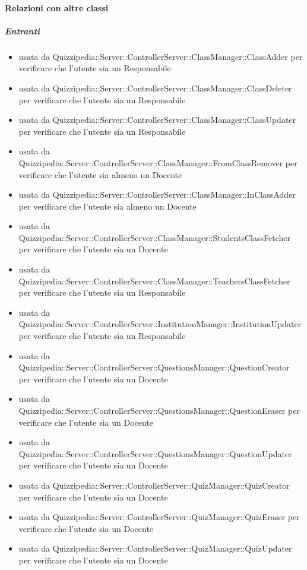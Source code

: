 \paragraph{Relazioni con altre classi}
\subparagraph{Entranti}
\begin{itemize}
\item usata da Quizzipedia::Server::ControllerServer::ClassManager::ClassAdder per verificare che l'utente sia un Responsabile
\item usata da Quizzipedia::Server::ControllerServer::ClassManager::ClassDeleter per verificare che l'utente sia un Responsabile
\item usata da Quizzipedia::Server::ControllerServer::ClassManager::ClassUpdater per verificare che l'utente sia un Responsabile
\item usata da Quizzipedia::Server::ControllerServer::ClassManager::FromClassRemover per verificare che l'utente sia almeno un Docente
\item usata da Quizzipedia::Server::ControllerServer::ClassManager::InClassAdder per verificare che l'utente sia almeno un Docente
\item usata da Quizzipedia::Server::ControllerServer::ClassManager::StudentsClassFetcher per verificare che l'utente sia un Docente
\item usata da Quizzipedia::Server::ControllerServer::ClassManager::TeachersClassFetcher per verificare che l'utente sia un Responsabile
\item usata da Quizzipedia::Server::ControllerServer::InstitutionManager::InstitutionUpdater per verificare che l'utente sia un Responsabile
\item usata da Quizzipedia::Server::ControllerServer::QuestionsManager::QuestionCreator per verificare che l'utente sia un Docente
\item usata da Quizzipedia::Server::ControllerServer::QuestionsManager::QuestionEraser per verificare che l'utente sia un Docente
\item usata da Quizzipedia::Server::ControllerServer::QuestionsManager::QuestionUpdater per verificare che l'utente sia un Docente
\item usata da Quizzipedia::Server::ControllerServer::QuizManager::QuizCreator per verificare che l'utente sia un Docente
\item usata da Quizzipedia::Server::ControllerServer::QuizManager::QuizEraser per verificare che l'utente sia un Docente
\item usata da Quizzipedia::Server::ControllerServer::QuizManager::QuizUpdater per verificare che l'utente sia un Docente

\end{itemize}
